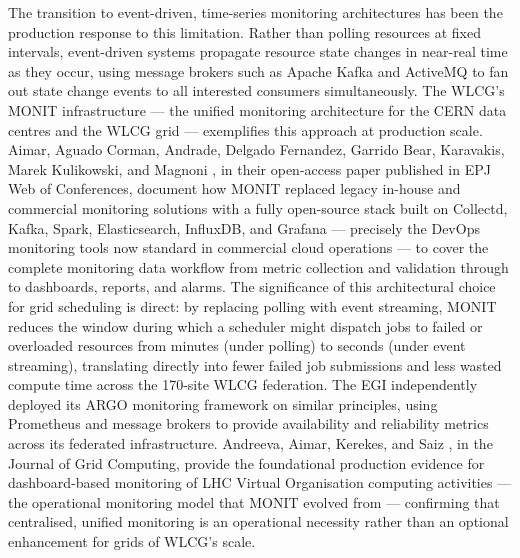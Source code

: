 \documentclass[12pt,a4paper]{report}
\begin{document}
The transition to event-driven, time-series monitoring architectures has been the production response to this limitation. Rather than polling 
resources at fixed intervals, event-driven systems propagate resource state changes in near-real time as they occur, using message brokers such 
as Apache Kafka and ActiveMQ to fan out state change events to all interested consumers simultaneously. The WLCG’s MONIT infrastructure — the 
unified monitoring architecture for the CERN data centres and the WLCG grid — exemplifies this approach at production scale. Aimar, Aguado Corman, 
Andrade, Delgado Fernandez, Garrido Bear, Karavakis, Marek Kulikowski, and Magnoni \parencite{aimar2019monit}, in their open-access paper published in EPJ Web of
 Conferences, document how MONIT replaced legacy in-house and commercial monitoring solutions with a fully open-source stack built on Collectd,
  Kafka, Spark, Elasticsearch, InfluxDB, and Grafana — precisely the DevOps monitoring tools now standard in commercial cloud operations — to 
  cover the complete monitoring data workflow from metric collection and validation through to dashboards, reports, and alarms. The significance 
  of this architectural choice for grid scheduling is direct: by replacing polling with event streaming, MONIT reduces the window during which a 
  scheduler might dispatch jobs to failed or overloaded resources from minutes (under polling) to seconds (under event streaming), translating 
  directly into fewer failed job submissions and less wasted compute time across the 170-site WLCG federation. The EGI independently deployed its 
  ARGO monitoring framework on similar principles, using Prometheus and message brokers to provide availability and reliability metrics across its 
  federated infrastructure. Andreeva, Aimar, Kerekes, and Saiz \parencite{andreeva2010dashboard}, in the Journal of Grid Computing, provide the foundational production evidence 
  for dashboard-based monitoring of LHC Virtual Organisation computing activities — the operational monitoring model that MONIT evolved from 
  — confirming that centralised, unified monitoring is an operational necessity rather than an optional enhancement for grids of WLCG’s scale.
\end{document}
